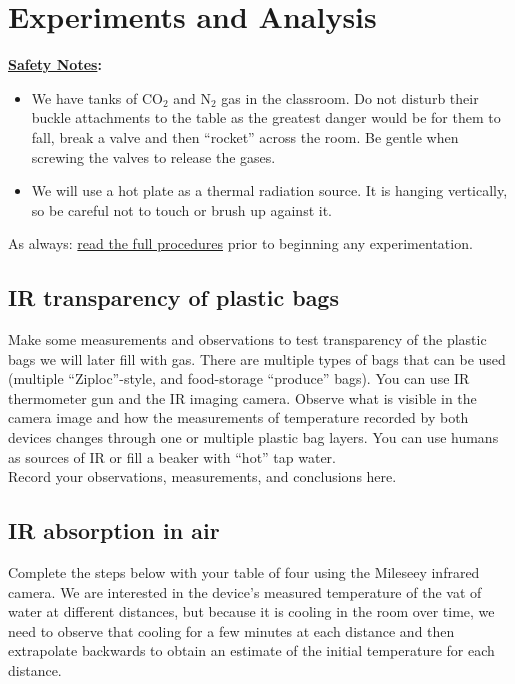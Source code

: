 \section{Experiments and Analysis}

{\bf \underline{Safety Notes}:} 
	\begin{itemize}
	\item We have tanks of $\text{CO}_2$ and $\text{N}_2$ gas in the classroom.  Do not disturb their buckle attachments to the table as the greatest danger would be for them to fall, break a valve and then ``rocket'' across the room.  Be gentle when screwing the valves to release the gases.
	\item We will use a hot plate as a thermal radiation source. It is hanging vertically, so be careful not to touch or brush up against it.
	\end{itemize}
	
\noindent As always: \underline{read the full procedures} prior to beginning any experimentation.

\subsection{IR transparency of plastic bags}

Make some measurements and observations to test  transparency of the plastic bags we will later fill with gas.  There are multiple types of bags that can be used (multiple ``Ziploc''-style, and food-storage ``produce'' bags). You can use IR thermometer gun and the IR imaging camera.  Observe what is visible in the camera image and how the measurements of temperature recorded by both devices changes through one or multiple plastic bag layers.  You can use humans as sources of IR or fill a beaker with ``hot'' tap water.\\[-6pt]

\noindent Record your observations, measurements, and conclusions here.

\answerspace[7cm]


\subsection{IR absorption in air}

Complete the steps below with your table of four using the Mileseey infrared camera. We are interested in the device's measured temperature of the vat of water at different distances, but because it is cooling in the room over time, we need to observe that cooling for a few minutes at each distance and then extrapolate backwards to obtain an estimate of the initial temperature for each distance. \\


